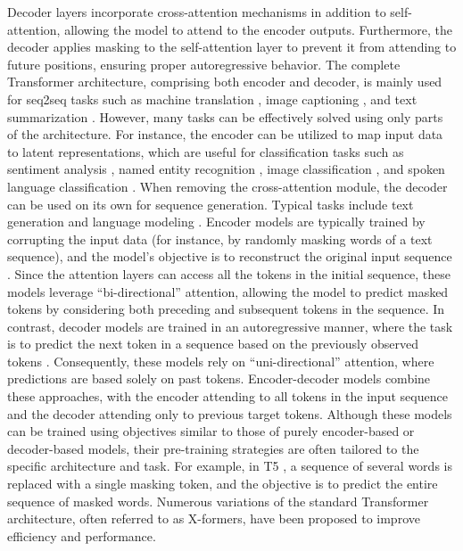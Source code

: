 Decoder layers incorporate cross-attention mechanisms in addition to self-attention, allowing the model to attend to the encoder outputs. Furthermore, the decoder applies masking to the self-attention layer to prevent it from attending to future positions, ensuring proper autoregressive behavior. The complete Transformer architecture, comprising both encoder and decoder, is mainly used for seq2seq tasks such as machine translation \cite{Raffel_T5_2020}, image captioning \cite{Li_Li_Xiong_Hoi_2022}, and text summarization \cite{Raffel_T5_2020}.
However, many tasks can be effectively solved using only parts of the architecture.
For instance, the encoder can be utilized to map input data to latent representations, which are useful for classification tasks such as sentiment analysis \cite{Perez_sentiment_2021}, named entity recognition \cite{Luoma_Exploring_2020}, image classification \cite{dosovitskiyImageWorth16x162021}, and spoken language classification \cite{Baevski_wav2vec2_2020}.
When removing the cross-attention module, the decoder can be used on its own for sequence generation. Typical tasks include text generation and language modeling \cite{radfordImprovingLanguageUnderstanding2018}. Encoder models are typically trained by corrupting the input data (for instance, by randomly masking words of a text sequence), and the model's objective is to reconstruct the original input sequence \cite{devlinBERTPretrainingDeep2019}.
Since the attention layers can access all the tokens in the initial sequence, these models leverage ``bi-directional'' attention, allowing the model to predict masked tokens by considering both preceding and subsequent tokens in the sequence.
In contrast, decoder models are trained in an autoregressive manner, where the task is to predict the next token in a sequence based on the previously observed tokens \cite{radfordImprovingLanguageUnderstanding2018}. Consequently, these models rely on ``uni-directional'' attention, where predictions are based solely on past tokens. Encoder-decoder models combine these approaches, with the encoder attending to all tokens in the input sequence and the decoder attending only to previous target tokens.
Although these models can be trained using objectives similar to those of purely encoder-based or decoder-based models, their pre-training strategies are often tailored to the specific architecture and task. For example, in T5 \cite{Raffel_T5_2020}, a sequence of several words is replaced with a single masking token, and the objective is to predict the entire sequence of masked words. Numerous variations of the standard Transformer architecture, often referred to as X-formers, have been proposed to improve efficiency and performance.
